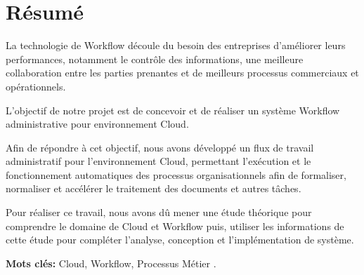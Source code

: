 \chapter*{Résumé}

\large

La technologie de Workflow découle du besoin des entreprises d’améliorer leurs performances, notamment le contrôle des informations, une meilleure collaboration entre les parties prenantes et de meilleurs processus commerciaux et opérationnels.

L'objectif de notre projet est de concevoir et de réaliser un système Workflow administrative  pour environnement Cloud.
 

Afin de répondre à cet objectif,  nous avons développé un flux de travail administratif pour l'environnement Cloud, permettant l'exécution et le fonctionnement automatiques des processus organisationnels afin de formaliser, normaliser et accélérer le traitement des documents et autres tâches.

Pour réaliser ce travail, nous avons dû mener une étude théorique pour comprendre le domaine de Cloud  et Workflow  puis, utiliser les informations de cette étude pour compléter l'analyse, conception et l'implémentation de système.



\textbf{Mots clés:} Cloud, Workflow, Processus Métier .   


\normalsize


